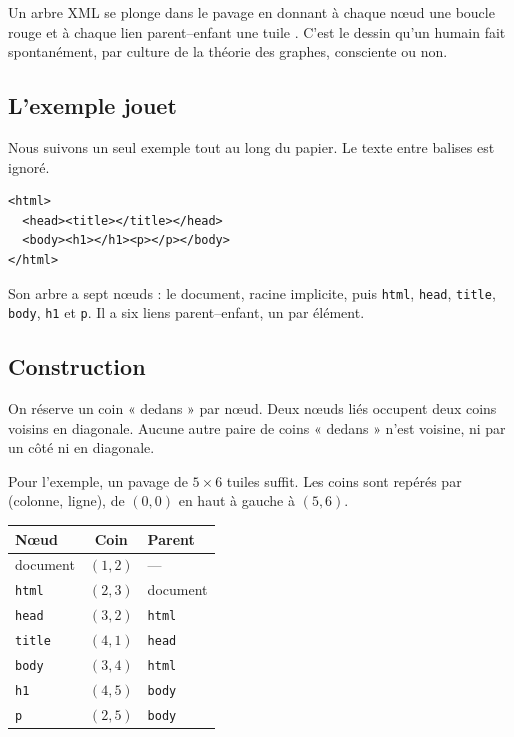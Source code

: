 \documentclass[11pt,a4paper]{article}
\theoremstyle{remark}
\newcommand{\balise}[1]{\texttt{#1}}
\begin{document}
Un arbre XML se plonge dans le pavage en donnant à chaque nœud une boucle rouge
et à chaque lien parent–enfant une tuile \CONNECT. C'est le dessin qu'un humain
fait spontanément, par culture de la théorie des graphes, consciente ou non.

\subsection{L'exemple jouet}

Nous suivons un seul exemple tout au long du papier. Le texte entre balises est
ignoré.

\begin{Verbatim}[xleftmargin=2em,fontsize=\small]
<html>
  <head><title></title></head>
  <body><h1></h1><p></p></body>
</html>
\end{Verbatim}

Son arbre a sept nœuds : le document, racine implicite, puis \balise{html},
\balise{head}, \balise{title}, \balise{body}, \balise{h1} et \balise{p}. Il a six
liens parent–enfant, un par élément.

\subsection{Construction}

On réserve un coin « dedans » par nœud. Deux nœuds liés occupent deux coins
voisins en diagonale. Aucune autre paire de coins « dedans » n'est voisine, ni
par un côté ni en diagonale.

Pour l'exemple, un pavage de $5\times 6$ tuiles suffit. Les coins sont repérés
par (colonne, ligne), de $(0,0)$ en haut à gauche à $(5,6)$.

\begin{center}
\begin{tabular}{@{}lcl@{}}
  \toprule
  Nœud & Coin & Parent \\
  \midrule
  document      & $(1,2)$ & --- \\
  \balise{html}  & $(2,3)$ & document \\
  \balise{head}  & $(3,2)$ & \balise{html} \\
  \balise{title} & $(4,1)$ & \balise{head} \\
  \balise{body}  & $(3,4)$ & \balise{html} \\
  \balise{h1}    & $(4,5)$ & \balise{body} \\
  \balise{p}     & $(2,5)$ & \balise{body} \\
  \bottomrule
\end{tabular}
\end{center}
\end{document}
